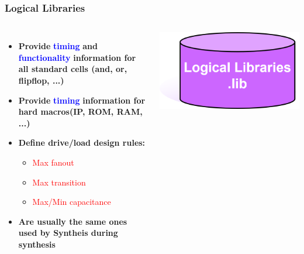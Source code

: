 \documentclass[compress]{beamer}
\begin{document}
\begin{frame}
	\frametitle{Logical Libraries}
		\begin{columns}	
			\begin{itemize}
				\item \textbf{Provide} \textcolor{blue}{\textbf{timing}} \textbf{and} \textcolor{blue}{\textbf{functionality}} \textbf{information for all
				standard cells (and, or, flipflop, ...)}
				\item \textbf{Provide} \textcolor{blue}{\textbf{timing}} \textbf{information for hard macros(IP, ROM, RAM, ...)}
				\item \textbf{Define drive/load design rules:}
					\begin{itemize}
						\item \textcolor{red}{Max fanout}
						\item \textcolor{red}{Max transition}
						\item \textcolor{red}{Max/Min capacitance}
					\end{itemize}
			\item \textbf{Are usually the same ones used by Syntheis during synthesis}
			\end{itemize}
			\begin{center}
				\includegraphics[width=0.9 \textwidth]{lib}
			\end{center}
		\end{columns}
\end{frame}
\end{document}
